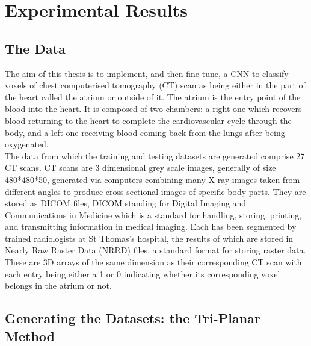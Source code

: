 \chapter{Experimental Results}

\section{The Data}

\noindent The aim of this thesis is to implement, and then fine-tune, a CNN to classify voxels of chest computerised tomography (CT) scan as being either in the part of the heart called the atrium or outside of it. The atrium is the entry point of the blood into the heart. It is composed of two chambers: a right one which recovers blood returning to the heart to complete the cardiovascular cycle through the body, and a left one receiving blood coming back from the lungs after being oxygenated.\\

\noindent The data from which the training and testing datasets are generated comprise 27 CT scans. CT scans are 3 dimensional grey scale images, generally of size 480*480*50, generated via computers combining many X-ray images taken from different angles to produce cross-sectional images of specific body parts. They are stored as DICOM files, DICOM standing for Digital Imaging and Communications in Medicine which is a standard for handling, storing, printing, and transmitting information in medical imaging. Each has been segmented by trained radiologists at St Thomas's hospital, the results of which are stored in Nearly Raw Raster Data (NRRD) files, a standard format for storing raster data. These are 3D arrays of the same dimension as their corresponding CT scan with each entry being either a 1 or 0 indicating whether its corresponding voxel belongs in the atrium or not. 

\section{Generating the Datasets: the Tri-Planar Method}

